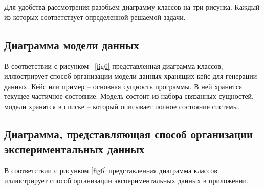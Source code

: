 \documentclass[14pt]{extreport}
\begin{document}
Для удобства рассмотрения разобьем диаграмму классов на три рисунка. Каждый из которых соответствует определенной решаемой задачи. 

\subsection{Диаграмма модели данных}
В соответствии с рисунком ~\ref{fig6} представленная диаграмма классов,
иллюстрирует способ организации модели данных хранящих кейс для генерации данных. Кейс или пример -- основная сущность программы. В ней хранится текущее частичное состояние. Модель состоит из набора связанных сущностей, модели хранятся в списке -- который описывает полное состояние системы.



\subsection{Диаграмма, представляющая способ организации экспериментальных данных}

В соответствии с рисунком \ref{fig6} представленная диаграмма классов иллюстрирует способ организации экспериментальных данных в приложении. 
\end{document}
